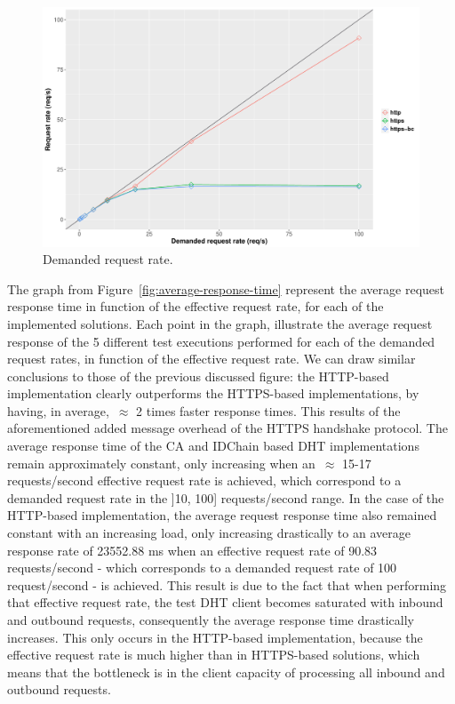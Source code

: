 \begin{figure}[htb]
  \centering
  \includegraphics[scale=0.4]{Figures/evaluation/request-rate-writes-linear.pdf}
  \caption{Demanded request rate.}
\label{fig:demanded-request-rate}
\end{figure}


The graph from Figure~\ref{fig:average-response-time} represent the average request response time in function of the effective request rate, for each of the implemented solutions.
Each point in the graph, illustrate the average request response of the 5 different test executions performed for each of the demanded request rates, in function of the effective request rate.
We can draw similar conclusions to those of the previous discussed figure: the HTTP-based implementation clearly outperforms the HTTPS-based implementations, by having, in average,~$\approx$ 2 times faster response times.
This results of the aforementioned added message overhead of the HTTPS handshake protocol.
The average response time of the CA and IDChain based DHT implementations remain approximately constant, only increasing when an~$\approx$ 15-17 requests/second effective request rate is achieved, which correspond to a demanded request rate in the ]10, 100] requests/second range.
In the case of the HTTP-based implementation, the average request response time also remained constant with an increasing load, only increasing drastically to an average response rate of 23552.88 ms when an effective request rate of 90.83 requests/second - which corresponds to a demanded request rate of 100 request/second - is achieved.
This result is due to the fact that when performing that effective request rate, the test DHT client becomes saturated with inbound and outbound requests, consequently the average response time drastically increases.
This only occurs in the HTTP-based implementation, because the effective request rate is much higher than in HTTPS-based solutions, which means that the bottleneck is in the client capacity of processing all inbound and outbound requests.

